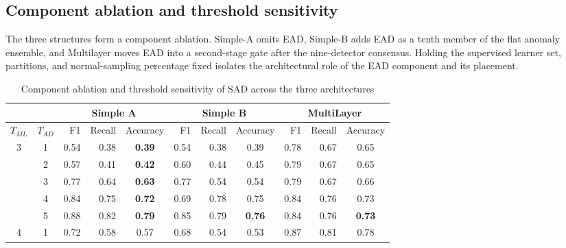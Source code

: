\documentclass[12pt]{article}
\begin{document}
\subsection*{Component ablation and threshold sensitivity}
The three structures form a component ablation. Simple-A omits EAD, Simple-B
adds EAD as a tenth member of the flat anomaly ensemble, and Multilayer moves
EAD into a second-stage gate after the nine-detector consensus. Holding the
supervised learner set, partitions, and normal-sampling percentage fixed
isolates the architectural role of the EAD component and its placement.
    \begin{table}[H]
        \centering
        \caption{Component ablation and threshold sensitivity of SAD across the three architectures}
        \label{table3}
        \scriptsize
        \begin{tabular}{rrrrrrrrrrr}
            \hline
            &&\multicolumn{3}{c}{Simple A} &  \multicolumn{3}{c}{Simple B} &  \multicolumn{3}{c}{MultiLayer} \\
            \hline
            \multicolumn{1}{c}{$T_{ML}$} & \multicolumn{1}{c}{$T_{AD}$} & F1 & Recall & \multicolumn{1}{c}{Accuracy}  & F1 & Recall & \multicolumn{1}{c}{Accuracy}  & F1 & Recall & \multicolumn{1}{c}{Accuracy}\\
            \hline
            \multicolumn{1}{c}{\multirow{5}{*}{3}} & \multicolumn{1}{c}{1}& 0.54 & 0.38 & \multicolumn{1}{c}{\textbf{0.39}} & 0.54 & 0.38 & \multicolumn{1}{c}{0.39}  & 0.78 & 0.67 & \multicolumn{1}{c}{0.65} \\
            \multicolumn{1}{c}{} & \multicolumn{1}{c}{2}& 0.57 & 0.41 & \multicolumn{1}{c}{\textbf{0.42}} & 0.60 & 0.44 & \multicolumn{1}{c}{0.45} & 0.79 & 0.67 & \multicolumn{1}{c}{0.65} \\
            \multicolumn{1}{c}{} & \multicolumn{1}{c}{3}& 0.77 & 0.64 & \multicolumn{1}{c}{\textbf{0.63}} & 0.77 & 0.54 & \multicolumn{1}{c}{0.54} & 0.79 & 0.67 & \multicolumn{1}{c}{0.66}\\
            \multicolumn{1}{c}{} & \multicolumn{1}{c}{4}& 0.84 & 0.75 & \multicolumn{1}{c}{\textbf{0.72}} & 0.69 & 0.78 & \multicolumn{1}{c}{0.75} & 0.84 & 0.76 & \multicolumn{1}{c}{0.73} \\
            \multicolumn{1}{c}{} & \multicolumn{1}{c}{5}& 0.88 & 0.82 & \multicolumn{1}{c}{\textbf{0.79}} & 0.85 & 0.79 & \multicolumn{1}{c}{\textbf{0.76}} & 0.84 & 0.76 & \multicolumn{1}{c}{\textbf{0.73}} \\
            \hline
            \multicolumn{1}{c}{\multirow{5}{*}{4}} & \multicolumn{1}{c}{1}& 0.72 & 0.58 & \multicolumn{1}{c}{0.57}& 0.68 & 0.54 & \multicolumn{1}{c}{0.53}& 0.87 & 0.81 & \multicolumn{1}{c}{0.78} \\

\end{tabular}
\end{table}
\end{document}
